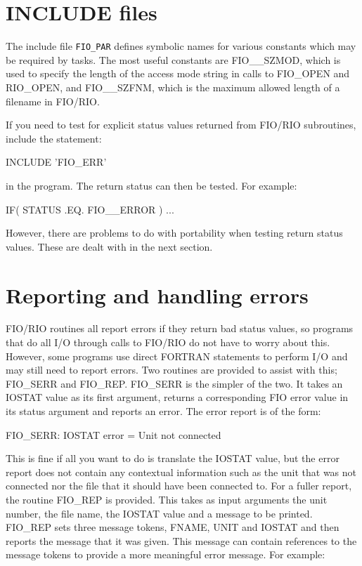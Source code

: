 \documentclass[twoside,11pt,nolof]{starlink}
\begin{document}
\section{INCLUDE files}
\label{include-files}

The include file \texttt{FIO\_PAR} defines symbolic names for various constants
which  may be required by tasks. The most useful constants are FIO\_\_SZMOD,
which is used to specify the length of the access mode string in calls to
FIO\_OPEN and RIO\_OPEN, and FIO\_\_SZFNM, which is the maximum allowed length
of a filename in FIO/RIO.

If you need to test for explicit status values returned from FIO/RIO
subroutines, include the statement:

\begin{terminalv}
      INCLUDE 'FIO\_ERR'
\end{terminalv}

in the program. The return status can then be tested. For example:

\begin{terminalv}
      IF( STATUS .EQ. FIO__ERROR ) ...
\end{terminalv}

However, there are problems to do with portability when testing return status
values. These are dealt with in the next section.

\section{Reporting and handling errors}
\label{errors}

FIO/RIO routines all report errors if they return bad status values, so
programs that do all I/O through calls to FIO/RIO do not have to worry about
this. However, some programs use direct FORTRAN statements to perform I/O and
may still need to report errors. Two routines are provided to assist with this;
FIO\_SERR and FIO\_REP. FIO\_SERR is the simpler of the two. It takes an IOSTAT
value as its first argument, returns a corresponding FIO error value in its
status argument and reports an error. The error report is of the form:

\begin{terminalv}
FIO_SERR: IOSTAT error = Unit not connected
\end{terminalv}

This is fine if all you want to do is translate the IOSTAT value, but the error
report does not contain any contextual information such as the unit that was
not connected nor the file that it should have been connected to. For a fuller
report, the routine FIO\_REP is provided. This takes as input arguments the
unit number, the file name, the IOSTAT value and a message to be printed.
FIO\_REP sets three message tokens, FNAME, UNIT and IOSTAT and then reports the
message that it was given. This message can contain references to the message
tokens to provide a more meaningful error message. For example:
\end{document}
